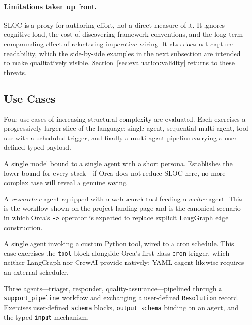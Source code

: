 \documentclass[sigconf,nonacm]{acmart}
\begin{document}
\paragraph{Limitations taken up front.} SLOC is a proxy for authoring
effort, not a direct measure of it. It ignores cognitive load, the cost
of discovering framework conventions, and the long-term compounding
effect of refactoring imperative wiring. It also does not capture
readability, which the side-by-side examples in the next subsection are
intended to make qualitatively visible. Section~\ref{sec:evaluation:validity}
returns to these threats.

\subsection{Use Cases}
\label{sec:evaluation:usecases}

Four use cases of increasing structural complexity are evaluated. Each
exercises a progressively larger slice of the language: single agent,
sequential multi-agent, tool use with a scheduled trigger, and finally a
multi-agent pipeline carrying a user-defined typed payload.

\begin{description}[leftmargin=*,style=nextline]
  \item[UC1 Single-agent assistant.] A single model bound to a single
        agent with a short persona. Establishes the lower bound for every
        stack---if Orca does not reduce SLOC here, no more complex case
        will reveal a genuine saving.
  \item[UC2 Two-agent sequential pipeline.] A \emph{researcher} agent
        equipped with a web-search tool feeding a \emph{writer} agent.
        This is the workflow shown on the project landing page and is the
        canonical scenario in which Orca's \texttt{->} operator is
        expected to replace explicit LangGraph edge construction.
  \item[UC3 Scheduled tool-using agent.] A single agent invoking a custom
        Python tool, wired to a cron schedule. This case exercises the
        \texttt{tool} block alongside Orca's first-class \texttt{cron}
        trigger, which neither LangGraph nor CrewAI provide natively; YAML
        cagent likewise requires an external scheduler.
  \item[UC4 Typed multi-agent pipeline.] Three agents---triager,
        responder, quality-assurance---pipelined through a
        \texttt{support\_pipeline} workflow and exchanging a user-defined
        \texttt{Resolution} record. Exercises user-defined \texttt{schema}
        blocks, \texttt{output\_schema} binding on an agent, and the
        typed \texttt{input} mechanism.
\end{description}
\end{document}

